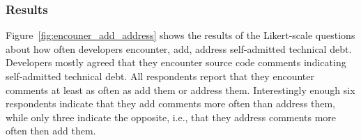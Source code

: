 

\subsubsection*{Results} 
Figure~\ref{fig:encouner_add_address} shows the results of the Likert-scale questions about how often developers encounter, add, address self-admitted technical debt. Developers mostly agreed that they encounter source code comments indicating self-admitted technical debt. 
All respondents report that they encounter \SATD comments at least as often as add them or address them.
Interestingly enough six respondents indicate that they add \SATD comments more often than address them,
while only three indicate the opposite, i.e., that they address \SATD comments more often then add them.


